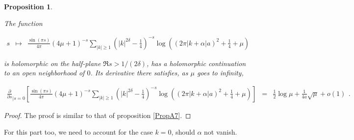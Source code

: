 \documentclass{jams-l}
\newtheorem{proposition}[theorem]{Proposition}
\theoremstyle{definition}
\theoremstyle{remark}
\numberwithin{equation}{section}
\begin{document}
            \begin{proposition}
            \label{PropA9}
            
                The function
                
                \[ \begin{array}{lll}
                        s & \longmapsto & \frac{\sin \left( \pi s \right)}{4 \pi} \left( 4 \mu + 1 \right)^{-s} \sum\limits_{\left \vert k \right \vert \geqslant 1} \left( \left \vert k \right \vert^{2 \delta} - \frac{1}{4} \right)^{-s} \log \left( \left( 2 \pi \left \vert k + \alpha \right \vert a \right)^2 + \frac{1}{4} + \mu \right)
                    \end{array} \]
                
                \noindent is holomorphic on the half-plane $\Re s > 1/\left( 2 \delta \right)$, has a holomorphic continuation to an open neighborhood of $0$. Its derivative there satisfies, as $\mu$ goes to infinity,
                
                \[ \begin{array}{lll}
                        \scriptstyle \frac{\partial}{\partial s}_{\left \vert s = 0 \right.} \left[ \frac{\sin \left( \pi s \right)}{4 \pi} \left( 4 \mu + 1 \right)^{-s} \sum\limits_{\left \vert k \right \vert \geqslant 1} \left( \left \vert k \right \vert^{2 \delta} - \frac{1}{4} \right)^{-s} \log\left( \left( 2 \pi \left \vert k + \alpha \right \vert a \right)^2 + \frac{1}{4} + \mu \right) \right] & \scriptstyle = & \scriptstyle \frac{1}{2} \log \mu + \frac{1}{4a} \sqrt{\mu} + o \left( 1 \right)
                    \end{array} . \]
            
            \end{proposition}
            
            \begin{proof}
            
                The proof is similar to that of proposition \ref{PropA7}.
            
            \end{proof}
            
            For this part too, we need to account for the case $k = 0$, should $\alpha$ not vanish.
            
\end{document}
